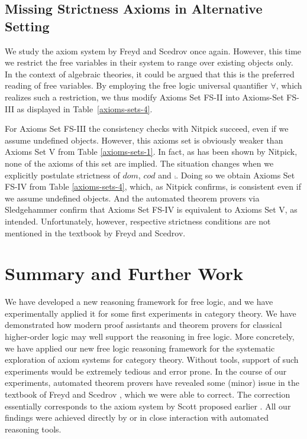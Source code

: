 \subsection{Missing Strictness Axioms in Alternative
  Setting} \label{subsec-freyd-scedrov-2} We study the axiom system by
Freyd and Scedrov once again. However, this time we restrict the free
variables in their system to range over existing objects only. In the
context of algebraic theories, it could be argued that this is the
preferred reading of free variables.  By employing the free logic
universal quantifier $\forall$, which realizes such a restriction, 
we thus modify Axioms Set FS-II into
Axioms-Set FS-III as displayed in Table~\ref{axioms-sets-4}.  

For Axioms Set FS-III the consistency checks with Nitpick succeed,
even if we assume undefined objects. However, this axioms set is
obviously weaker than Axioms Set V from Table
\ref{axioms-sets-1}. In fact, as has been shown by Nitpick, none of
the axioms of this set are implied.  The situation changes when we
explicitly postulate strictness of $dom$, $cod$ and $\comp$. Doing
so we obtain Axioms Set FS-IV from Table \ref{axioms-sets-4}, which,
as Nitpick confirms, is consistent even if we assume undefined
objects. And the automated theorem provers via Sledgehammer confirm
that Axioms Set FS-IV is equivalent to Axioms Set V, as
intended. Unfortunately, however, respective strictness conditions are
not mentioned in the textbook by Freyd and Scedrov.





\section{Summary and Further Work}
We have developed a new reasoning framework for free logic, and we
have experimentally applied it for some first experiments in category
theory.  We have demonstrated how modern proof assistants and theorem
provers for classical higher-order logic may well support the
reasoning in free logic. More concretely, we have applied our new free
logic reasoning framework for the systematic exploration of axiom
systems for category theory. Without tools, support of such experiments
would be extremely tedious and error prone.
In the course of our experiments, automated theorem provers 
have revealed some (minor) issue in the textbook of Freyd and Scedrov \cite{FreydScedrov90},
which we were able to correct. The correction essentially corresponds
to the axiom system by Scott proposed earlier \cite{Scott67}.
All our findings were achieved directly by or in
close interaction with automated reasoning tools. 

